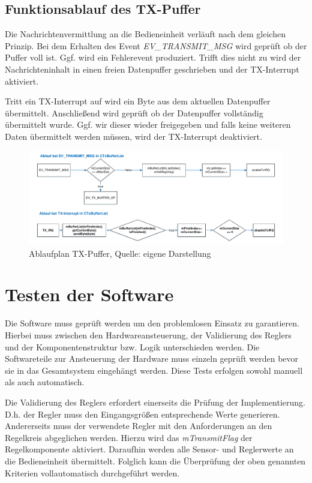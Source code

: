 \documentclass{article}
\begin{document}
\subsection*{Funktionsablauf des TX-Puffer}
Die Nachrichtenvermittlung an die Bedieneinheit verläuft nach dem gleichen Prinzip. Bei dem Erhalten des Event \textit{EV\_TRANSMIT\_MSG} wird geprüft ob der Puffer voll ist. Ggf. wird ein Fehlerevent produziert. Trifft dies nicht zu wird der Nachrichteninhalt in einen freien Datenpuffer geschrieben und der TX-Interrupt aktiviert.

Tritt ein TX-Interrupt auf wird ein Byte aus dem aktuellen Datenpuffer übermittelt. Anschließend wird geprüft ob der Datenpuffer vollständig übermittelt wurde. Ggf. wir dieser wieder freigegeben und falls keine weiteren Daten übermittelt werden müssen, wird der TX-Interrupt deaktiviert.

\begin{figure}[h]
	\includegraphics[width=\linewidth]{PAP_TxPuffer}
	\caption{Ablaufplan TX-Puffer, Quelle: eigene Darstellung}
\end{figure}

\newpage
\section{Testen der Software}
Die Software muss geprüft werden um den problemlosen Einsatz zu garantieren. Hierbei muss zwischen den Hardwareansteuerung, der Validierung des Reglers und der Komponentenstruktur bzw. Logik unterschieden werden.
Die Softwareteile zur Ansteuerung der Hardware muss einzeln geprüft werden bevor sie in das Gesamtsystem eingehängt werden. Diese Tests erfolgen sowohl manuell als auch automatisch.

Die Validierung des Reglers erfordert einerseits die Prüfung der Implementierung. D.h. der Regler muss den Eingangsgrößen entsprechende Werte generieren. Andererseits muss der verwendete Regler mit den Anforderungen an den Regelkreis abgeglichen werden. Hierzu wird das \textit{mTransmitFlag} der Regelkomponente aktiviert. Daraufhin werden alle Sensor- und Reglerwerte an die Bedieneinheit übermittelt. Folglich kann die Überprüfung der oben genannten Kriterien vollautomatisch durchgeführt werden.
\end{document}
